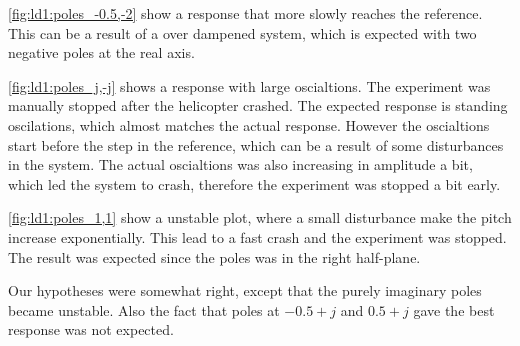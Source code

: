 \autoref{fig:ld1:poles_-0.5,-2} show a response that more slowly reaches the reference. This can be a result of a over dampened system, which is expected with two negative poles at the real axis.



\autoref{fig:ld1:poles_j,-j} shows a response with large oscialtions. The experiment was manually stopped after the helicopter crashed. The expected response is standing oscilations, which almost matches the actual response. However the oscialtions start before the step in the reference, which can be a result of some disturbances in the system. The actual oscialtions was also increasing in amplitude a bit, which led the system to crash, therefore the experiment was stopped a bit early.



\autoref{fig:ld1:poles_1,1} show a unstable plot, where a small disturbance make the pitch increase exponentially. This lead to a fast crash and the experiment was stopped. The result was expected since the poles was in the right half-plane.

Our hypotheses were somewhat right, except that the purely imaginary poles became unstable. Also the fact that poles at $-0.5 +j$ and $0.5 + j$ gave the best response was not expected.